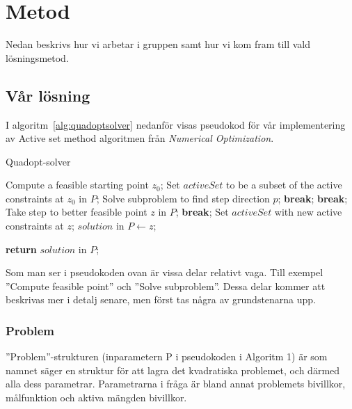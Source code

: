 \section{Metod}
Nedan beskrivs hur vi arbetar i gruppen samt hur vi kom fram till vald lösningsmetod. 



\subsection{Vår lösning}
I algoritm~\ref{alg:quadoptsolver} nedanför visas pseudokod för vår implementering av Active set method algoritmen från \emph{Numerical Optimization}.

\begin{algorithm}[H]
\caption{Quadopt-solver}
\label{alg:quadoptsolver}
\begin{algorithmic}
	\State Compute a feasible starting point $z_0$;
\EndIf	
\State Set $activeSet$ to be a subset of the active constraints at $z_0$ in $P$;
	\State Solve subproblem to find step direction $p$;
			\State \textbf{break};
		\EndIf		
			\State \textbf{break};
		\EndIf
	\Else
		\State Take step to better feasible point $z$ in $P$;
			\State \textbf{break};
		\EndIf
		\State Set $activeSet$ with new active constraints at $z$;	
	\EndIf
\EndWhile
\State  $solution$ in $P\gets z$;

\State \textbf{return} $solution$ in $P$;
	
\EndProcedure
\end{algorithmic}
\end{algorithm}

Som man ser i pseudokoden ovan är vissa delar relativt vaga. Till exempel ''Compute feasible point'' och ''Solve subproblem''. Dessa delar kommer att beskrivas mer i detalj senare, men först tas några av grundstenarna upp.

\subsubsection{Problem}
''Problem''-strukturen (inparametern P i pseudokoden i Algoritm 1) är som namnet säger en struktur för att lagra det kvadratiska problemet, och därmed alla dess parametrar. Parametrarna i fråga är bland annat problemets bivillkor, målfunktion och aktiva mängden bivillkor.

